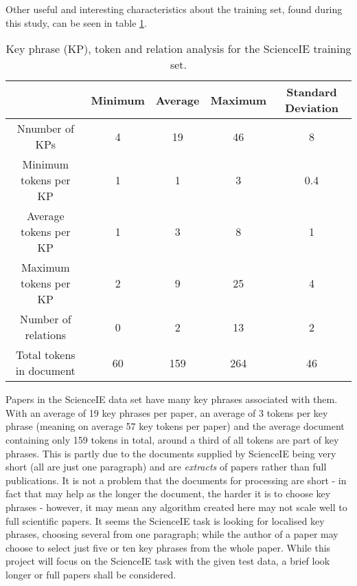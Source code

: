 Other useful and interesting characteristics about the training set, found during this study, can be seen in table \ref{table:traininganalysis}. 

\begin{table}
	\centering
	\begin{tabular}{ c | c c c c }
		& Minimum & Average & Maximum & Standard Deviation \\
		\hline
		Nnumber of KPs & 4 & 19 & 46 & 8 \\
		Minimum tokens per KP & 1 & 1 & 3 & 0.4 \\
		Average tokens per KP & 1 & 3 & 8 & 1 \\
		Maximum tokens per KP & 2 & 9 & 25 & 4 \\
		Number of relations & 0 & 2 & 13 & 2 \\
		Total tokens in document & 60 & 159 & 264 & 46
	\end{tabular}
	\caption[Training set analysis]{Key phrase (KP), token and relation analysis for the ScienceIE training set.}
	\label{table:traininganalysis}
\end{table}

Papers in the ScienceIE data set have many key phrases associated with them. With an average of 19 key phrases per paper, an average of 3 tokens per key phrase (meaning on average 57 key tokens per paper) and the average document containing only 159 tokens in total, around a third of all tokens are part of key phrases. This is partly due to the documents supplied by ScienceIE being very short (all are just one paragraph) and are \textit{extracts} of papers rather than full publications. It is not a problem that the documents for processing are short - in fact that may help as the longer the document, the harder it is to choose key phrases \cite{Hasan2014} - however, it may mean any algorithm created here may not scale well to full scientific papers. It seems the ScienceIE task is looking for localised key phrases, choosing several from one paragraph; while the author of a paper may choose to select just five or ten key phrases from the whole paper. While this project will focus on the ScienceIE task with the given test data, a brief look longer or full papers shall be considered.
